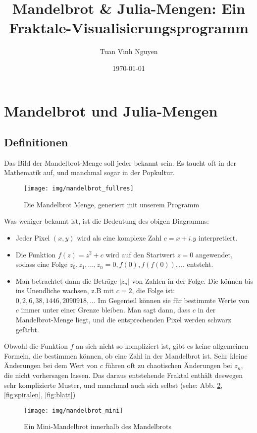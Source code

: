 \documentclass{article}
\title{Mandelbrot \& Julia-Mengen: Ein Fraktale-Visualisierungsprogramm} %
\author{Tuan Vinh Nguyen} %
\date{\today} %
\begin{document}
		\maketitle %
		
\section{Mandelbrot und Julia-Mengen}
\subsection{Definitionen}
Das Bild der Mandelbrot-Menge soll jeder bekannt sein. Es taucht oft in der Mathematik auf, und manchmal sogar in der Popkultur.
\begin{figure}[!htb]
\centering
\texttt{[image: img/mandelbrot\_fullres]}
\caption{Die Mandelbrot Menge, generiert mit unserem Programm}
\label{fig:mandelbrotfullres}
\end{figure}
Was weniger bekannt ist, ist die Bedeutung des obigen Diagramms: 
\begin{itemize}
\item Jeder Pixel $(x,y)$ wird als eine komplexe Zahl $c = x + i.y$ interpretiert.
\item Die Funktion $f(z) = z^2 +c$ wird auf den Startwert $z=0$ angewendet, sodass eine Folge $z_0, z_1, ..., z_n = 0, f(0), f(f(0)),...$ entsteht.
\item Man betrachtet dann die Beträge $|z_n|$ von Zahlen in der Folge. Die können bis ins Unendliche wachsen, z.B mit $c=2$, die Folge ist: $0,2,6,38,1446,2090918, ...$ Im Gegenteil können sie für bestimmte Werte von $c$ immer unter einer Grenze bleiben. Man sagt dann, dass $c$ in der Mandelbrot-Menge liegt, und die entsprechenden Pixel werden schwarz gefärbt. \cite{wiki-mandelbrot}
\end{itemize}
Obwohl die Funktion $f$ an sich nicht so kompliziert ist, gibt es keine allgemeinen Formeln, die bestimmen können, ob eine Zahl in der Mandelbrot ist. Sehr kleine Änderungen bei dem Wert von $c$ führen oft zu chaotischen Änderungen bei $z_n$, die nicht vorhersagen lassen. Das daraus entstehende Fraktal enthält deswegen sehr komplizierte Muster, und manchmal auch sich selbst (sehe: Abb. \ref{fig:mandelbrotmini}, \ref{fig:spiralen}, \ref{fig:blatt})

\begin{figure}
\centering
\texttt{[image: img/mandelbrot\_mini]}
\caption{Ein Mini-Mandelbrot innerhalb des Mandelbrots}
\label{fig:mandelbrotmini}
\end{figure}
\end{document}
